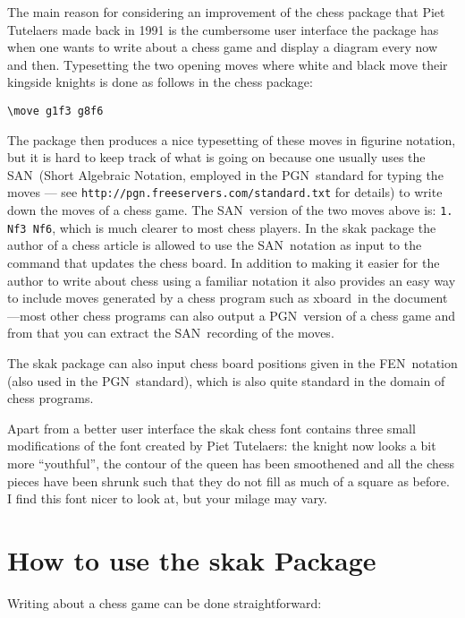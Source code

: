 \documentclass[11pt,twocolumn]{article}
\newcommand{\package}[1]{\textsf{#1}}
\newcommand{\pgn}{PGN\ }
\newcommand{\san}{SAN\ }
\newcommand{\fen}{FEN\ }
\newcommand{\xboard}{xboard}
\begin{document}
The main reason for considering an improvement of the \package{chess}
package that Piet Tutelaers made back in 1991 is the cumbersome user
interface the package has when one wants to write about a chess game
and display a diagram every now and then. Typesetting the two opening
moves where white and black move their kingside knights is done as
follows in the \package{chess} package:

\begin{verbatim}
\move g1f3 g8f6
\end{verbatim}

The package then produces a nice typesetting of these moves in figurine
notation, but it is hard to keep track of what is going on because one usually
uses the \san (Short Algebraic Notation, employed in the \pgn standard for
typing the moves --- see \texttt{http://pgn.freeservers.com/standard.txt} for
details) to write down the moves of a chess game. The \san version of the two
moves above is: \verb|1. Nf3 Nf6|, which is much clearer to most chess
players. In the \package{skak} package the author of a chess article is
allowed to use the \san notation as input to the command that updates the
chess board. In addition to making it easier for the author to write about
chess using a familiar notation it also provides an easy way to include moves
generated by a chess program such as \xboard\ in the document---most other
chess programs can also output a \pgn version of a chess game and from that
you can extract the \san recording of the moves.

The \package{skak} package can also input chess board positions given
in the \fen notation (also used in the \pgn standard), which is also quite
standard in the domain of chess programs. 

Apart from a better user interface the \package{skak} chess font
contains three small modifications of the font created by Piet
Tutelaers: the knight now looks a bit more ``youthful'', the contour
of the queen has been smoothened and all the chess pieces have been
shrunk such that they do not fill as much of a square as before. I
find this font nicer to look at, but your milage may vary.




\section{How to use the \package{skak} Package}
\label{sec:how-use-skak-package}

Writing about a chess game can be done straightforward:
\end{document}
